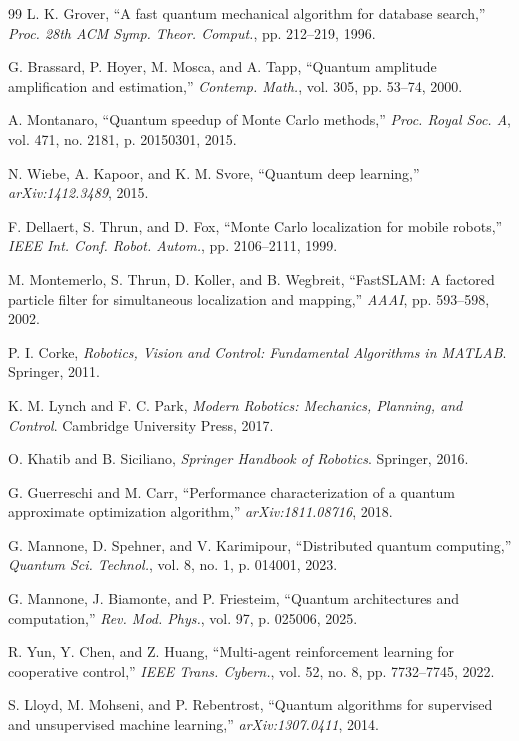 \documentclass[conference]{IEEEtran}
\begin{document}
\begin{thebibliography}{99}
 L. K. Grover, ``A fast quantum mechanical algorithm for database search,'' \textit{Proc. 28th ACM Symp. Theor. Comput.}, pp. 212--219, 1996.

 G. Brassard, P. Hoyer, M. Mosca, and A. Tapp, ``Quantum amplitude amplification and estimation,'' \textit{Contemp. Math.}, vol. 305, pp. 53--74, 2000.

 A. Montanaro, ``Quantum speedup of Monte Carlo methods,'' \textit{Proc. Royal Soc. A}, vol. 471, no. 2181, p. 20150301, 2015.

 N. Wiebe, A. Kapoor, and K. M. Svore, ``Quantum deep learning,'' \textit{arXiv:1412.3489}, 2015.

 F. Dellaert, S. Thrun, and D. Fox, ``Monte Carlo localization for mobile robots,'' \textit{IEEE Int. Conf. Robot. Autom.}, pp. 2106--2111, 1999.

 M. Montemerlo, S. Thrun, D. Koller, and B. Wegbreit, ``FastSLAM: A factored particle filter for simultaneous localization and mapping,'' \textit{AAAI}, pp. 593--598, 2002.

 P. I. Corke, \textit{Robotics, Vision and Control: Fundamental Algorithms in MATLAB}. Springer, 2011.

 K. M. Lynch and F. C. Park, \textit{Modern Robotics: Mechanics, Planning, and Control}. Cambridge University Press, 2017.

 O. Khatib and B. Siciliano, \textit{Springer Handbook of Robotics}. Springer, 2016.

 G. Guerreschi and M. Carr, ``Performance characterization of a quantum approximate optimization algorithm,'' \textit{arXiv:1811.08716}, 2018.

 G. Mannone, D. Spehner, and V. Karimipour, ``Distributed quantum computing,'' \textit{Quantum Sci. Technol.}, vol. 8, no. 1, p. 014001, 2023.

 G. Mannone, J. Biamonte, and P. Friesteim, ``Quantum architectures and computation,'' \textit{Rev. Mod. Phys.}, vol. 97, p. 025006, 2025.

 R. Yun, Y. Chen, and Z. Huang, ``Multi-agent reinforcement learning for cooperative control,'' \textit{IEEE Trans. Cybern.}, vol. 52, no. 8, pp. 7732--7745, 2022.

 S. Lloyd, M. Mohseni, and P. Rebentrost, ``Quantum algorithms for supervised and unsupervised machine learning,'' \textit{arXiv:1307.0411}, 2014.


\end{thebibliography}
\end{document}

